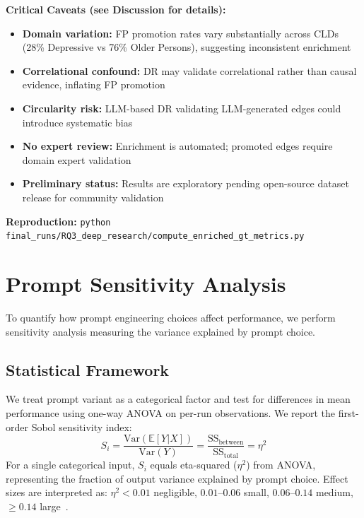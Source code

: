 \textbf{Critical Caveats (see Discussion for details):}
\begin{itemize}[noitemsep]
    \item \textbf{Domain variation:} FP promotion rates vary substantially across CLDs (28\% Depressive vs 76\% Older Persons), suggesting inconsistent enrichment
    \item \textbf{Correlational confound:} DR may validate correlational rather than causal evidence, inflating FP promotion
    \item \textbf{Circularity risk:} LLM-based DR validating LLM-generated edges could introduce systematic bias
    \item \textbf{No expert review:} Enrichment is automated; promoted edges require domain expert validation
    \item \textbf{Preliminary status:} Results are exploratory pending open-source dataset release for community validation
\end{itemize}

\textbf{Reproduction:} \texttt{python final\_runs/RQ3\_deep\_research/compute\_enriched\_gt\_metrics.py}

\section{Prompt Sensitivity Analysis}

To quantify how prompt engineering choices affect performance, we perform sensitivity analysis measuring the variance explained by prompt choice.

\subsection{Statistical Framework}
We treat prompt variant as a categorical factor and test for differences in mean performance using one-way ANOVA on per-run observations. We report the first-order Sobol sensitivity index:
\begin{equation}
S_i = \frac{\text{Var}(\mathbb{E}[Y|X])}{\text{Var}(Y)} = \frac{\text{SS}_\text{between}}{\text{SS}_\text{total}} = \eta^2
\end{equation}
For a single categorical input, $S_i$ equals eta-squared ($\eta^2$) from ANOVA, representing the fraction of output variance explained by prompt choice. Effect sizes are interpreted as: $\eta^2 < 0.01$ negligible, $0.01$--$0.06$ small, $0.06$--$0.14$ medium, $\geq 0.14$ large~\cite{cohen1988statistical}.

